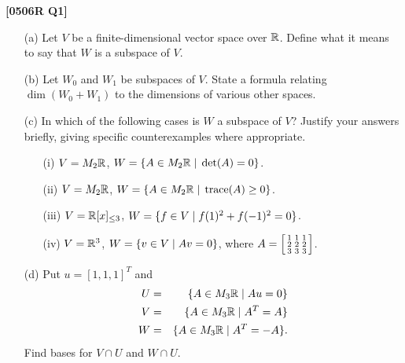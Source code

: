 \documentclass[a4paper]{article}
\begin{document}
\begin{problem}\textbf{[0506R Q1]}
 \begin{itemize}
  \item[(a)] Let $V$ be a finite-dimensional vector space over ${\mathbb{R}}$.  
   Define what it means to say that $W$ is a subspace of $V$.
  \item[(b)] Let $W_0$ and $W_1$ be subspaces of $V$.  State a formula
   relating $\dim(W_0+W_1)$ to the dimensions of various other spaces.
  \item[(c)] In which of the following cases is $W$ a subspace of $V$?
   Justify your answers briefly, giving specific
   counterexamples where appropriate. 
   \begin{itemize}
    \item[(i)] $V=M_2{\mathbb{R}}$, $W=\{A\in M_2{\mathbb{R}}\;|\;\det(A)=0\}$.
    \item[(ii)] $V=M_2{\mathbb{R}}$, $W=\{A\in M_2{\mathbb{R}}\;|\;\operatorname{trace}(A)\geq 0\}$.
    \item[(iii)] $V={\mathbb{R}}[x]_{\leq 3}$, $W=\{f\in V\;|\; f(1)^2+f(-1)^2=0\}$.
    \item[(iv)] $V={\mathbb{R}}^3$, $W=\{v\in V\;|\; Av=0\}$, where
     $A=\left[\begin{smallmatrix} 1&1&1\\2&2&2\\3&3&3\end{smallmatrix}\right]$.
   \end{itemize}
  \item[(d)] Put $u=[1,1,1]^T$ and 
   \begin{eqnarray*}
    U &=& \{A\in M_3{\mathbb{R}}\;|\; Au=0\} \\
    V &=& \{A\in M_3{\mathbb{R}}\;|\; A^T=A\} \\
    W &=& \{A\in M_3{\mathbb{R}}\;|\; A^T=-A\}.
   \end{eqnarray*}
   Find bases for $V\cap U$ and $W\cap U$. 
 \end{itemize}
\end{problem}
\end{document}
